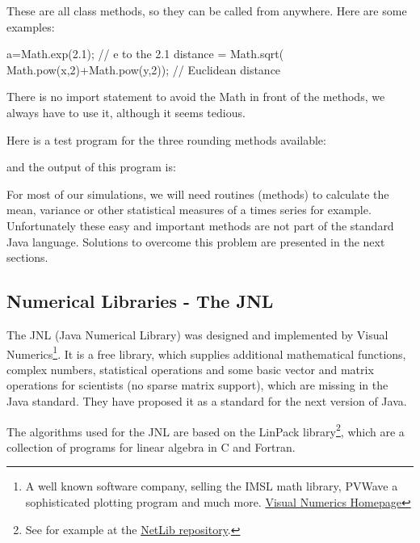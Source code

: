 These are all class methods, so they can be called from anywhere.
Here are some examples:
\begin{sverbatim}
 a=Math.exp(2.1);        // e to the 2.1
 distance = Math.sqrt(
            Math.pow(x,2)+Math.pow(y,2));  // Euclidean distance
\end{sverbatim} 
There is no import statement to avoid the Math in front
of the methods, we always have to use it, although it seems 
tedious.

Here is a test program for the three rounding methods available:

and the output of this program is:


For most of our simulations, we will need routines (methods) to
calculate the mean, variance or other statistical measures of
a times series for example. Unfortunately
these easy and important methods are not part of the
standard Java language. Solutions to overcome this problem 
are presented in the next sections.


\subsection{Numerical Libraries - The JNL}
The JNL (Java Numerical Library) was designed and implemented by 
Visual Numerics\footnote{A well known software company, selling the IMSL
math library, PVWave a sophisticated plotting program and much more. 
\href{http://www.vni.com/}{Visual Numerics Homepage}}.
It is a free library, which supplies additional 
mathematical functions, complex numbers, statistical operations 
and some basic vector and matrix operations for scientists (no
sparse matrix support), which
are missing in the Java standard. They have proposed it as a
standard for the next version of Java.

The algorithms used for the JNL are based on the LinPack library\footnote{See for
example at the \href{http://www.netlib.org/}{NetLib repository}.}, which
are a collection of programs for linear algebra in C and Fortran.


